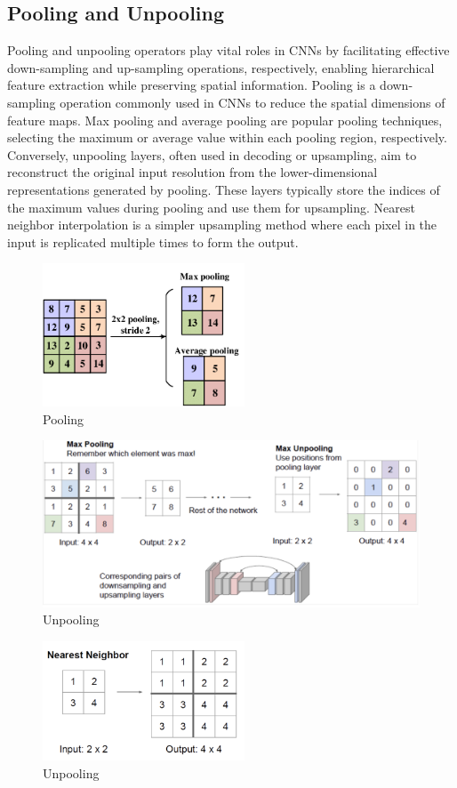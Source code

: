 \subsection{Pooling and Unpooling} Pooling and unpooling operators play vital roles in CNNs by facilitating effective down-sampling and up-sampling operations, respectively, enabling hierarchical feature extraction while preserving spatial information. Pooling is a down-sampling operation commonly used in CNNs to reduce the spatial dimensions of feature maps. Max pooling and average pooling are popular pooling techniques, selecting the maximum or average value within each pooling region, respectively. Conversely, unpooling layers, often used in decoding or upsampling, aim to reconstruct the original input resolution from the lower-dimensional representations generated by pooling. These layers typically store the indices of the maximum values during pooling and use them for upsampling. Nearest neighbor interpolation is a simpler upsampling method where each pixel in the input is replicated multiple times to form the output.
\begin{figure}[ht]
    \centering
    \includegraphics[width=6cm]{images/Theory-DL/Pool.png}
    \caption{Pooling}
    \label{fig:Pool}
\end{figure}\begin{figure}[ht]
    \centering
    \includegraphics[width=12cm]{images/Theory-DL/MaxUnPool.png}
    \caption{Unpooling}
    \label{fig:Unpool}
\end{figure}    
\begin{figure}[ht]
        \centering
        \includegraphics[width=6cm]{images/Theory-DL/NNUnpool.png}
        \caption{Unpooling}
        \label{fig:Unpool2}
    \end{figure}
